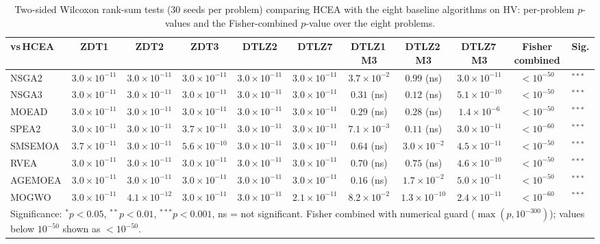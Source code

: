 \begin{table}[t]
\centering
\caption{Two-sided Wilcoxon rank-sum tests (30 seeds per problem) comparing HCEA with the eight baseline algorithms on HV: per-problem $p$-values and the Fisher-combined $p$-value over the eight problems.}
\label{tab:wilcoxon_hv}
\footnotesize
\setlength{\tabcolsep}{3pt}
\begin{tabular}{lcccccccc|cl}
\toprule
vs\,HCEA & ZDT1 & ZDT2 & ZDT3 & DTLZ2 & DTLZ7 & DTLZ1\,M3 & DTLZ2\,M3 & DTLZ7\,M3 & Fisher combined & Sig.\\
\midrule
NSGA2 & $3.0\times10^{-11}$ & $3.0\times10^{-11}$ & $3.0\times10^{-11}$ & $3.0\times10^{-11}$ & $3.0\times10^{-11}$ & $3.7\times10^{-2}$ & $0.99$ (ns) & $3.0\times10^{-11}$ & $<10^{-50}$ & $^{***}$ \\
NSGA3 & $3.0\times10^{-11}$ & $3.0\times10^{-11}$ & $3.0\times10^{-11}$ & $3.0\times10^{-11}$ & $3.0\times10^{-11}$ & $0.31$ (ns) & $0.12$ (ns) & $5.1\times10^{-10}$ & $<10^{-50}$ & $^{***}$ \\
MOEAD & $3.0\times10^{-11}$ & $3.0\times10^{-11}$ & $3.0\times10^{-11}$ & $3.0\times10^{-11}$ & $3.0\times10^{-11}$ & $0.29$ (ns) & $0.28$ (ns) & $1.4\times10^{-6}$ & $<10^{-50}$ & $^{***}$ \\
SPEA2 & $3.0\times10^{-11}$ & $3.0\times10^{-11}$ & $3.7\times10^{-11}$ & $3.0\times10^{-11}$ & $3.0\times10^{-11}$ & $7.1\times10^{-3}$ & $0.11$ (ns) & $3.0\times10^{-11}$ & $<10^{-60}$ & $^{***}$ \\
SMSEMOA & $3.7\times10^{-11}$ & $3.0\times10^{-11}$ & $5.6\times10^{-10}$ & $3.0\times10^{-11}$ & $3.0\times10^{-11}$ & $0.64$ (ns) & $3.0\times10^{-2}$ & $4.5\times10^{-11}$ & $<10^{-50}$ & $^{***}$ \\
RVEA & $3.0\times10^{-11}$ & $3.0\times10^{-11}$ & $3.0\times10^{-11}$ & $3.0\times10^{-11}$ & $3.0\times10^{-11}$ & $0.70$ (ns) & $0.75$ (ns) & $4.6\times10^{-10}$ & $<10^{-50}$ & $^{***}$ \\
AGEMOEA & $3.0\times10^{-11}$ & $3.0\times10^{-11}$ & $3.0\times10^{-11}$ & $3.0\times10^{-11}$ & $3.0\times10^{-11}$ & $0.16$ (ns) & $1.7\times10^{-2}$ & $5.0\times10^{-11}$ & $<10^{-50}$ & $^{***}$ \\
MOGWO & $3.0\times10^{-11}$ & $4.1\times10^{-12}$ & $3.0\times10^{-11}$ & $3.0\times10^{-11}$ & $2.1\times10^{-11}$ & $8.2\times10^{-2}$ & $1.3\times10^{-10}$ & $2.4\times10^{-11}$ & $<10^{-60}$ & $^{***}$ \\
\midrule
\multicolumn{11}{l}{\footnotesize Significance: $^{*}p<0.05$, $^{**}p<0.01$, $^{***}p<0.001$, ns = not significant. Fisher combined with numerical guard ($\max(p,10^{-300})$); values below $10^{-50}$ shown as $<10^{-50}$.}\\
\bottomrule
\end{tabular}
\end{table}
